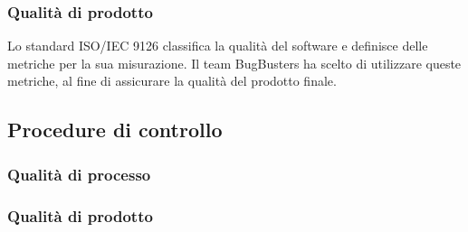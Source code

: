 \subsubsection{Qualit\`a di prodotto}
Lo standard ISO/IEC 9126 classifica la qualit\`a del software e definisce delle metriche per la sua misurazione. Il team BugBusters ha scelto di utilizzare queste metriche, al fine di assicurare la qualit\`a del prodotto finale.

\subsection{Procedure di controllo}
\subsubsection{Qualit\`a di processo}


\subsubsection{Qualit\`a di prodotto}